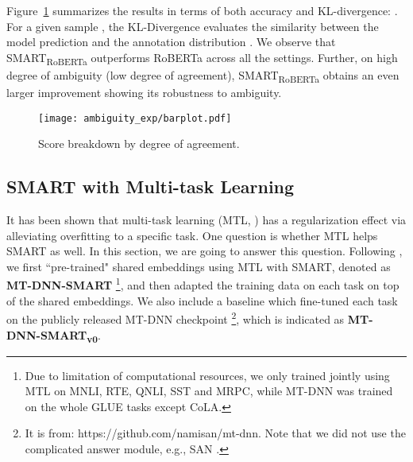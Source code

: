 \documentclass[11pt]{article} \usepackage{url}
\newcommand\model{SMART}
\begin{document}
Figure~\ref{fig:mnli_ambi} summarizes the results in terms of both accuracy and KL-divergence: . For a given sample , the KL-Divergence evaluates the similarity between the model prediction  and the annotation distribution . We observe that {\model}\textsubscript{RoBERTa} outperforms RoBERTa across all the settings. Further, on high degree of ambiguity (low degree of agreement), {\model}\textsubscript{RoBERTa} obtains an even larger improvement showing its robustness to ambiguity.  
 



\begin{figure}[!htb]
    \centering
    \texttt{[image: ambiguity\_exp/barplot.pdf]}
\caption{Score breakdown by degree of agreement.}
    \label{fig:mnli_ambi}
\end{figure}


\subsection{{\model} with Multi-task Learning}
\label{subsec:smart-mtl}


It has been shown that multi-task learning (MTL, \citet{caruana1997multitask,liu2015mtl,liu2019mt-dnn}) has a regularization effect via alleviating overfitting to a specific task. One question is whether MTL helps {\model} as well. In this section, we are going to answer this question. Following \citet{liu2019mt-dnn}, we first ``pre-trained" shared embeddings using MTL with {\model}, denoted as \textbf{MT-DNN-{\model}} \footnote{Due to limitation of computational resources, we only trained jointly using MTL on MNLI, RTE, QNLI, SST and MRPC, while MT-DNN was trained on the whole GLUE tasks except CoLA. 
}, and then adapted the training data on each task on top of the shared embeddings. We also include a baseline which fine-tuned each task on the publicly released MT-DNN checkpoint \footnote{It is from: https://github.com/namisan/mt-dnn. Note that we did not use the complicated answer module, e.g., SAN \cite{liu2018san4nli}.}, which is indicated as \textbf{MT-DNN-{\model}\textsubscript{v0}}.
\end{document}
